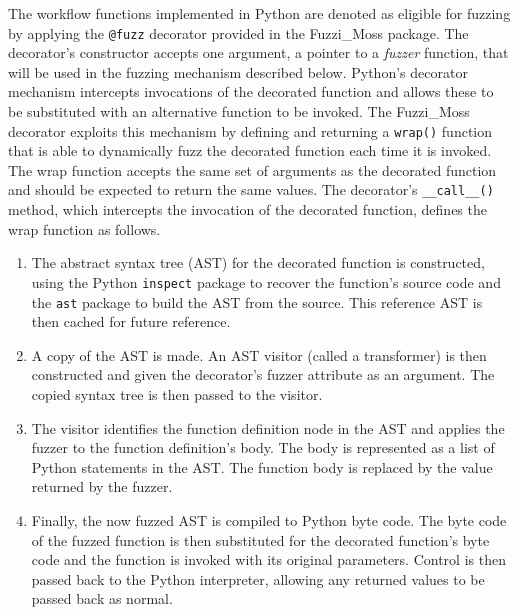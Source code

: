 \documentclass{sig-alternate}
\begin{document}

The workflow functions implemented in Python are denoted as eligible for fuzzing
by applying the \lstinline!@fuzz! decorator provided in the Fuzzi\_Moss
package. The decorator's constructor accepts one argument, a pointer to a
\emph{fuzzer} function, that will be used in the fuzzing mechanism described
below.  Python's decorator mechanism intercepts invocations of the decorated
function and allows these to be substituted with an alternative function to be
invoked.  The Fuzzi\_Moss decorator exploits this mechanism by defining and
returning a \lstinline!wrap()!  function that is able to dynamically fuzz the
decorated function each time it is invoked.  The wrap function accepts the same
set of arguments as the decorated function and should be expected to return the
same values. The decorator's \lstinline!__call__()!  method, which intercepts
the invocation of the decorated function, defines the wrap function as follows.

\begin{enumerate}

\item The abstract syntax tree (AST) for the decorated function is constructed,
  using the Python \lstinline!inspect! package to recover the function's source
  code and the \lstinline!ast!  package to build the AST from the source.  This
  reference AST is then cached for future reference.

\item A copy of the AST is made.  An AST visitor (called a transformer) is then
  constructed and given the decorator's fuzzer attribute as an argument.  The
  copied syntax tree is then passed to the visitor.

\item The visitor identifies the function definition node in the AST and applies
  the fuzzer to the function definition's body.  The body is represented as a
  list of Python statements in the AST.  The function body is replaced by the
  value returned by the fuzzer.

\item Finally, the now fuzzed AST is compiled to Python byte code.  The byte
  code of the fuzzed function is then substituted for the decorated function's
  byte code and the function is invoked with its original parameters.  Control
  is then passed back to the Python interpreter, allowing any returned values to
  be passed back as normal.

\end{enumerate}
\end{document}
